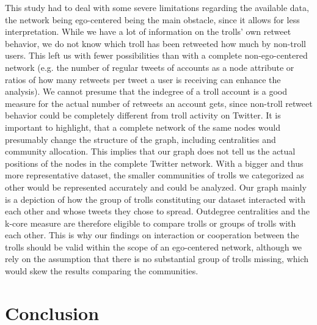 \documentclass[12pt, titlepage=true, toc=bib]{scrartcl}
\begin{document}
This study had to deal with some severe limitations regarding the available data, the network being ego-centered being the main obstacle, since it allows for less interpretation. While we have a lot of information on the trolls' own retweet behavior, we do not know which troll has been retweeted how much by non-troll users. This left us with fewer possibilities than with a complete non-ego-centered network (e.g. the number of regular tweets of accounts as a node attribute or ratios of how many retweets per tweet a user is receiving can enhance the analysis). We cannot presume that the indegree of a troll account is a good measure for the actual number of retweets an account gets, since non-troll retweet behavior could be completely different from troll activity on Twitter. It is important to highlight, that a complete network of the same nodes would presumably change the structure of the graph, including centralities and community allocation. This implies that our graph does not tell us the actual positions of the nodes in the complete Twitter network. With a bigger and thus more representative dataset, the smaller communities of trolls we categorized as other would be represented accurately and could be analyzed. Our graph mainly is a depiction of how the group of trolls constituting our dataset interacted with each other and whose tweets they chose to spread. Outdegree centralities and the k-core measure are therefore eligible to compare trolls or groups of trolls with each other. This is why our findings on interaction or cooperation between the trolls should be valid within the scope of an ego-centered network, although we rely on the assumption that there is no substantial group of trolls missing, which would skew the results comparing the communities.


\section{Conclusion}
\end{document}
